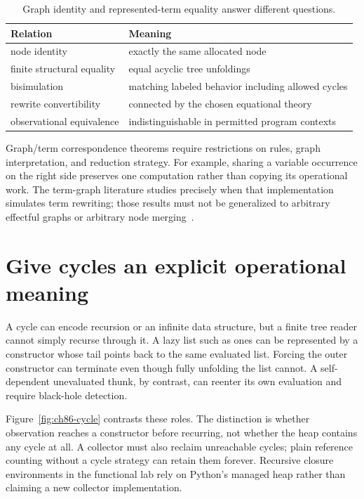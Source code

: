 \begin{table}[htbp]
\caption{Graph identity and represented-term equality answer different questions.}
\label{tab:ch86-equalities}
\centering
\begin{tabular}{ll}
\toprule
Relation & Meaning \\
\midrule
node identity & exactly the same allocated node \\
finite structural equality & equal acyclic tree unfoldings \\
bisimulation & matching labeled behavior including allowed cycles \\
rewrite convertibility & connected by the chosen equational theory \\
observational equivalence & indistinguishable in permitted program contexts \\
\bottomrule
\end{tabular}
\end{table}

Graph/term correspondence theorems require restrictions on rules, graph interpretation, and reduction strategy.
For example, sharing a variable occurrence on the right side preserves one computation rather than copying its operational work.
The term-graph literature studies precisely when that implementation simulates term rewriting; those results must not be generalized to arbitrary effectful graphs or arbitrary node merging~\cite{barendregt-1987-term-graphs}.

\section{Give cycles an explicit operational meaning}
\label{sec:ch86-cycles}
A cycle can encode recursion or an infinite data structure, but a finite tree reader cannot simply recurse through it.
A lazy list such as ones can be represented by a constructor whose tail points back to the same evaluated list.
Forcing the outer constructor can terminate even though fully unfolding the list cannot.
A self-dependent unevaluated thunk, by contrast, can reenter its own evaluation and require black-hole detection.

Figure~\ref{fig:ch86-cycle} contrasts these roles.
The distinction is whether observation reaches a constructor before recurring, not whether the heap contains any cycle at all.
A collector must also reclaim unreachable cycles; plain reference counting without a cycle strategy can retain them forever.
Recursive closure environments in the functional lab rely on Python's managed heap rather than claiming a new collector implementation.

